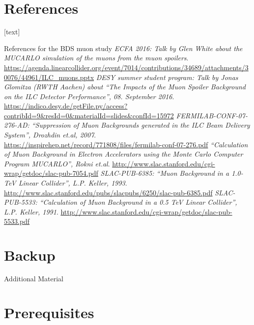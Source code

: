 \documentclass[xcolor={dvipsnames}]{beamer}
\begin{document}
\section*{References}
\begin{thebibliography}{9}
[text]
\begin{frame}{References for the BDS muon study}
\tiny
{}  \emph{ECFA 2016: Talk by Glen White about the MUCARLO simulation of the muons from the muon spoilers}. \url{https://agenda.linearcollider.org/event/7014/contributions/34689/attachments/30076/44961/ILC_muons.pptx}
  \emph{DESY summer student program: Talk by Jonas Glomitza (RWTH Aachen) about ``The Impacts of the Muon Spoiler Background on the ILC Detector Performance'', 08. September 2016}. \url{https://indico.desy.de/getFile.py/access?contribId=9&resId=0&materialId=slides&confId=15972}
  \emph{FERMILAB-CONF-07-276-AD: ``Suppression of Muon Backgrounds generated in the ILC Beam Delivery System'', Drozhdin et.al, 2007}. \url{https://inspirehep.net/record/771808/files/fermilab-conf-07-276.pdf}
  \emph{``Calculation of Muon Background in Electron Accelerators using the Monte Carlo Computer Program MUCARLO'', Rokni et.al}. \url{http://www.slac.stanford.edu/cgi-wrap/getdoc/slac-pub-7054.pdf}
  \emph{SLAC-PUB-6385: ``Muon Background in a 1.0-TeV Linear Collider'', L.P. Keller, 1993}. \url{http://www.slac.stanford.edu/pubs/slacpubs/6250/slac-pub-6385.pdf}
  \emph{SLAC-PUB-5533: ``Calculation of Muon Background in a 0.5 TeV Linear Collider'', L.P. Keller, 1991}. \url{http://www.slac.stanford.edu/cgi-wrap/getdoc/slac-pub-5533.pdf}
\end{frame}

\end{thebibliography}

\section{Backup}
\appendix

\begin{frame}
\begin{center}
\LARGE Additional Material
\end{center}
  \tableofcontents
\end{frame}

\section{Prerequisites}
\end{document}
